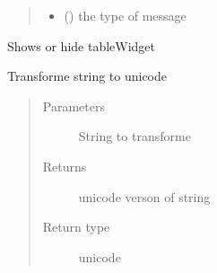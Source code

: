 \documentclass[letterpaper,10pt,english]{sphinxmanual}
\begin{document}
\begin{fulllineitems}
\begin{fulllineitems}
\begin{quote}
\begin{description}
\begin{itemize}
\item {} 
 () \textendash{} the type of message

\end{itemize}

\end{description}\end{quote}

\end{fulllineitems}


\begin{fulllineitems}
\label{\detokenize{code:Tilgjengelighet.Tilgjengelighet.show_tabell}}
Shows or hide tableWidget

\end{fulllineitems}


\begin{fulllineitems}
\label{\detokenize{code:Tilgjengelighet.Tilgjengelighet.tilgjengelighetsvurdering}}
\end{fulllineitems}


\begin{fulllineitems}
\label{\detokenize{code:Tilgjengelighet.Tilgjengelighet.to_unicode}}
Transforme string to unicode
\begin{quote}\begin{description}
\item[{Parameters}] \leavevmode
{} \textendash{} String to transforme

\item[{Returns}] \leavevmode
unicode verson of string

\item[{Return type}] \leavevmode
unicode

\end{description}\end{quote}


\end{fulllineitems}
\end{fulllineitems}
\end{document}
